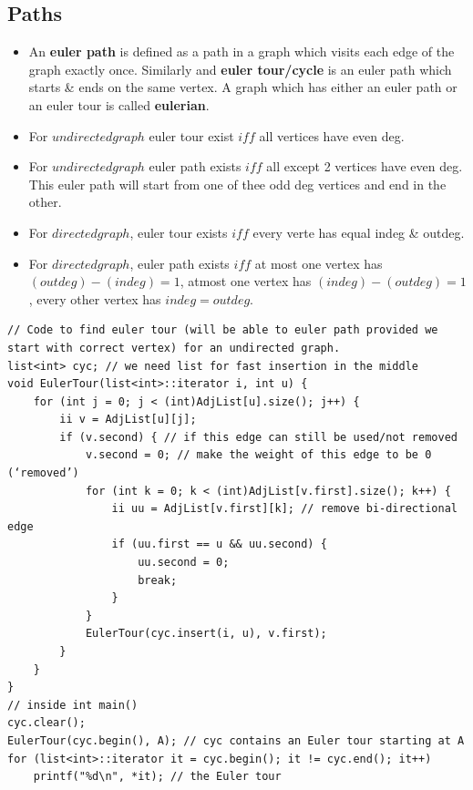 \documentclass[8pt, a4paper, oneside, twocolumn]{extarticle}
\begin{document}
\subsection{Paths}
\begin{itemize}
    \item An \textbf{euler path} is defined as a path in a graph which visits each edge of the graph exactly once. Similarly and \textbf{euler tour/cycle }is an euler path which starts \& ends on the same vertex. A graph which has either an euler path or an euler tour is called \textbf{eulerian}.
    \item For $undirected graph$ euler tour exist $iff$ all vertices have even deg.
    \item For $undirected graph$ euler path exists $iff$ all except 2 vertices have even deg. This euler path will start from one of thee odd deg vertices and end in the other.
    \item For $directed graph$, euler tour exists $iff$ every verte has equal indeg \& outdeg.
    \item For $directed graph$, euler path exists $iff$ at most one vertex has $(outdeg) - (indeg) = 1$, atmost one vertex has $(indeg) - (outdeg) = 1$, every other vertex has $indeg = outdeg$.
\end{itemize}
\begin{verbatim}
// Code to find euler tour (will be able to euler path provided we start with correct vertex) for an undirected graph.
list<int> cyc; // we need list for fast insertion in the middle
void EulerTour(list<int>::iterator i, int u) {
    for (int j = 0; j < (int)AdjList[u].size(); j++) {
        ii v = AdjList[u][j];
        if (v.second) { // if this edge can still be used/not removed
            v.second = 0; // make the weight of this edge to be 0 (‘removed’)
            for (int k = 0; k < (int)AdjList[v.first].size(); k++) {
                ii uu = AdjList[v.first][k]; // remove bi-directional edge
                if (uu.first == u && uu.second) {
                    uu.second = 0;
                    break;
                } 
            }
            EulerTour(cyc.insert(i, u), v.first);
        } 
    }
}
// inside int main()
cyc.clear();
EulerTour(cyc.begin(), A); // cyc contains an Euler tour starting at A
for (list<int>::iterator it = cyc.begin(); it != cyc.end(); it++)
    printf("%d\n", *it); // the Euler tour
\end{verbatim}
\end{document}
